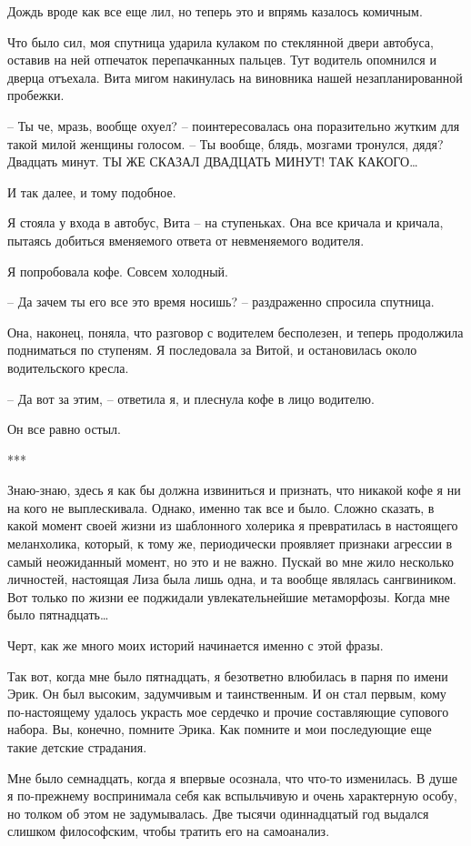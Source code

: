 \documentclass[
]{book}
\begin{document}
Дождь вроде как все еще лил, но теперь это и впрямь казалось комичным.

Что было сил, моя спутница ударила кулаком по стеклянной двери автобуса, оставив на ней отпечаток перепачканных пальцев. Тут водитель опомнился и дверца отъехала. Вита мигом накинулась на виновника нашей незапланированной пробежки.

-- Ты че, мразь, вообще охуел? -- поинтересовалась она поразительно жутким для такой милой женщины голосом. -- Ты вообще, блядь, мозгами тронулся, дядя? Двадцать минут. ТЫ ЖЕ СКАЗАЛ ДВАДЦАТЬ МИНУТ! ТАК КАКОГО\ldots{}

И так далее, и тому подобное.

Я стояла у входа в автобус, Вита -- на ступеньках. Она все кричала и кричала, пытаясь добиться вменяемого ответа от невменяемого водителя.

Я попробовала кофе. Совсем холодный.

-- Да зачем ты его все это время носишь? -- раздраженно спросила спутница.

Она, наконец, поняла, что разговор с водителем бесполезен, и теперь продолжила подниматься по ступеням. Я последовала за Витой, и остановилась около водительского кресла.

-- Да вот за этим, -- ответила я, и плеснула кофе в лицо водителю.

Он все равно остыл.

***

Знаю-знаю, здесь я как бы должна извиниться и признать, что никакой кофе я ни на кого не выплескивала. Однако, именно так все и было. Сложно сказать, в какой момент своей жизни из шаблонного холерика я превратилась в настоящего меланхолика, который, к тому же, периодически проявляет признаки агрессии в самый неожиданный момент, но это и не важно. Пускай во мне жило несколько личностей, настоящая Лиза была лишь одна, и та вообще являлась сангвиником. Вот только по жизни ее поджидали увлекательнейшие метаморфозы. Когда мне было пятнадцать\ldots{}

Черт, как же много моих историй начинается именно с этой фразы.

Так вот, когда мне было пятнадцать, я безответно влюбилась в парня по имени Эрик. Он был высоким, задумчивым и таинственным. И он стал первым, кому по-настоящему удалось украсть мое сердечко и прочие составляющие супового набора. Вы, конечно, помните Эрика. Как помните и мои последующие еще такие детские страдания.

Мне было семнадцать, когда я впервые осознала, что что-то изменилась. В душе я по-прежнему воспринимала себя как вспыльчивую и очень характерную особу, но толком об этом не задумывалась. Две тысячи одиннадцатый год выдался слишком философским, чтобы тратить его на самоанализ.
\end{document}
